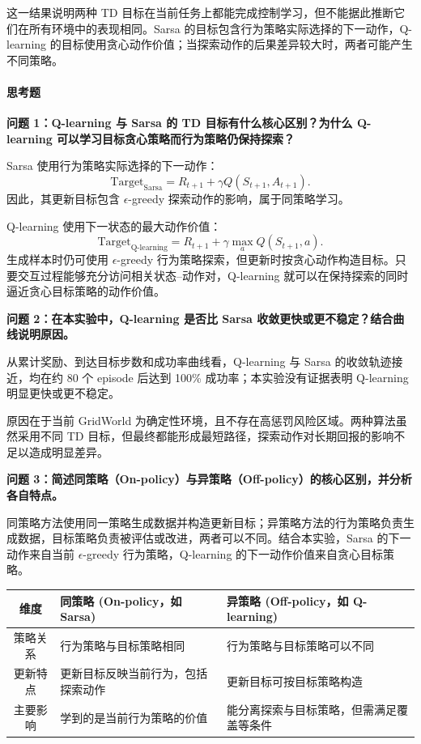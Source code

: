 \documentclass[11pt,a4paper,UTF8]{ctexart}
\numberwithin{figure}{section}
\numberwithin{table}{section}
\newcommand{\answerlabel}{%
  \par\smallskip\noindent{\heiti\bfseries 回答：}\quad}
\newcommand{\question}[1]{\par\smallskip\noindent\textbf{#1}\par}
\begin{document}
这一结果说明两种 TD 目标在当前任务上都能完成控制学习，但不能据此推断它们在所有环境中的表现相同。Sarsa 的目标包含行为策略实际选择的下一动作，Q-learning 的目标使用贪心动作价值；当探索动作的后果差异较大时，两者可能产生不同策略。

\paragraph{思考题}


\question{问题 1：Q-learning 与 Sarsa 的 TD 目标有什么核心区别？为什么 Q-learning 可以学习目标贪心策略而行为策略仍保持探索？}

\answerlabel Sarsa 使用行为策略实际选择的下一动作：
\[
\text{Target}_{\text{Sarsa}}
=R_{t+1}+\gamma Q(S_{t+1},A_{t+1}).
\]
因此，其更新目标包含 $\epsilon$-greedy 探索动作的影响，属于同策略学习。

Q-learning 使用下一状态的最大动作价值：
\[
\text{Target}_{\text{Q-learning}}
=R_{t+1}+\gamma\max_a Q(S_{t+1},a).
\]
生成样本时仍可使用 $\epsilon$-greedy 行为策略探索，但更新时按贪心动作构造目标。只要交互过程能够充分访问相关状态--动作对，Q-learning 就可以在保持探索的同时逼近贪心目标策略的动作价值。

\question{问题 2：在本实验中，Q-learning 是否比 Sarsa 收敛更快或更不稳定？结合曲线说明原因。}

\answerlabel 从累计奖励、到达目标步数和成功率曲线看，Q-learning 与 Sarsa 的收敛轨迹接近，均在约 80 个 episode 后达到 100\% 成功率；本实验没有证据表明 Q-learning 明显更快或更不稳定。

原因在于当前 GridWorld 为确定性环境，且不存在高惩罚风险区域。两种算法虽然采用不同 TD 目标，但最终都能形成最短路径，探索动作对长期回报的影响不足以造成明显差异。

\question{问题 3：简述同策略（On-policy）与异策略（Off-policy）的核心区别，并分析各自特点。}

\answerlabel 同策略方法使用同一策略生成数据并构造更新目标；异策略方法的行为策略负责生成数据，目标策略负责被评估或改进，两者可以不同。结合本实验，Sarsa 的下一动作来自当前 $\epsilon$-greedy 行为策略，Q-learning 的下一动作价值来自贪心目标策略。

\begin{table}[H]
\centering
\begin{tabular}{cC{6.0cm}C{6.0cm}}
\toprule
维度 & 同策略 (On-policy，如 Sarsa) & 异策略 (Off-policy，如 Q-learning) \\
\midrule
策略关系 & 行为策略与目标策略相同 & 行为策略与目标策略可以不同 \\
更新特点 & 更新目标反映当前行为，包括探索动作 & 更新目标可按目标策略构造 \\
主要影响 & 学到的是当前行为策略的价值 & 能分离探索与目标策略，但需满足覆盖等条件 \\
\bottomrule
\end{tabular}
\end{table}
\end{document}
